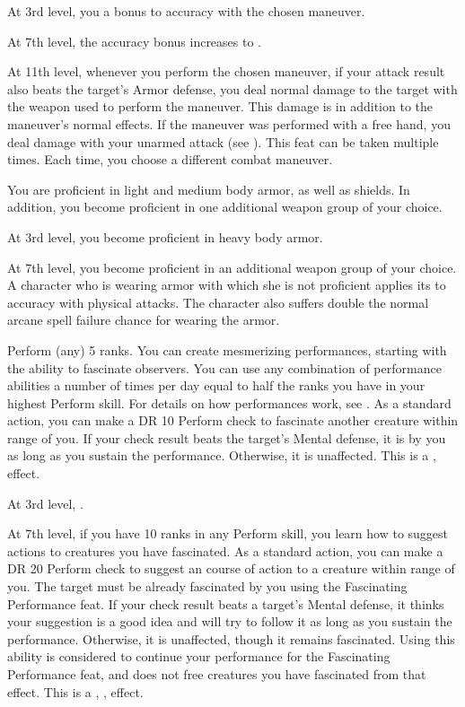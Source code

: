     At 3rd level, you a  bonus to accuracy with the chosen maneuver.

    At 7th level, the accuracy bonus increases to .

    At 11th level, whenever you perform the chosen maneuver, if your attack result also beats the target's Armor defense, you deal normal damage to the target with the weapon used to perform the maneuver.
    This damage is in addition to the maneuver's normal effects.
    If the maneuver was performed with a free hand, you deal damage with your unarmed attack (see ).
     This feat can be taken multiple times.
    Each time, you choose a different combat maneuver.

    \featben You are proficient in light and medium body armor, as well as shields.
    In addition, you become proficient in one additional weapon group of your choice.

    At 3rd level, you become proficient in heavy body armor.

    At 7th level, you become proficient in an additional weapon group of your choice.
    A character who is wearing armor with which she is not proficient applies its  to accuracy with physical attacks.
    The character also suffers double the normal arcane spell failure chance for wearing the armor.

    \featpre Perform (any) 5 ranks.
    \featben You can create mesmerizing performances, starting with the ability to fascinate observers.
    You can use any combination of performance abilities a number of times per day equal to half the ranks you have in your highest Perform skill.
    For details on how performances work, see .
    \featben As a standard action, you can make a DR 10 Perform check to fascinate another creature within \rngmed range of you.
    If your check result beats the target's Mental defense, it is \fascinated by you as long as you sustain the performance.
    Otherwise, it is unaffected.
    This is a ,  effect.

    At 3rd level, \tdash.

    At 7th level, if you have 10 ranks in any Perform skill, you learn how to suggest actions to creatures you have fascinated.
    As a standard action, you can make a DR 20 Perform check to suggest an course of action to a creature within \rngmed range of you.
    The target must be already fascinated by you using the Fascinating Performance feat.
    If your check result beats a target's Mental defense, it thinks your suggestion is a good idea and will try to follow it as long as you sustain the performance.
    Otherwise, it is unaffected, though it remains fascinated.
    Using this ability is considered to continue your performance for the Fascinating Performance feat, and does not free creatures you have fascinated from that effect.
    This is a , ,  effect.

